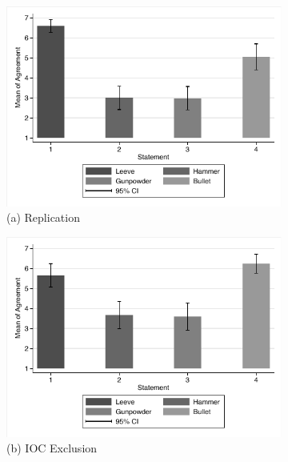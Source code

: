 \documentclass[egregdoesnotlikesansseriftitles,12pt]{scrartcl}
\begin{document}
\begin{landscape}
\begin{figure}[h!]
   \begin{subfigure}[t]{0.28\textwidth}
      \includegraphics[scale=0.7]{figures/rev_rep_bar.pdf}
      \caption{\textsf{\scriptsize(a) Replication}}
      \label{fig:rev_rep_bar}
   \end{subfigure}
   \begin{subfigure}[t]{0.28\textwidth}
      \includegraphics[scale=0.7]{figures/rev_ioc_bar.pdf}
      \caption{\textsf{\scriptsize(b) IOC Exclusion}}
      \label{fig:rev_ioc_bar}
   \end{subfigure}
   \begin{subfigure}[t]{0.28\textwidth}

\end{subfigure}
\end{figure}
\end{landscape}
\end{document}
